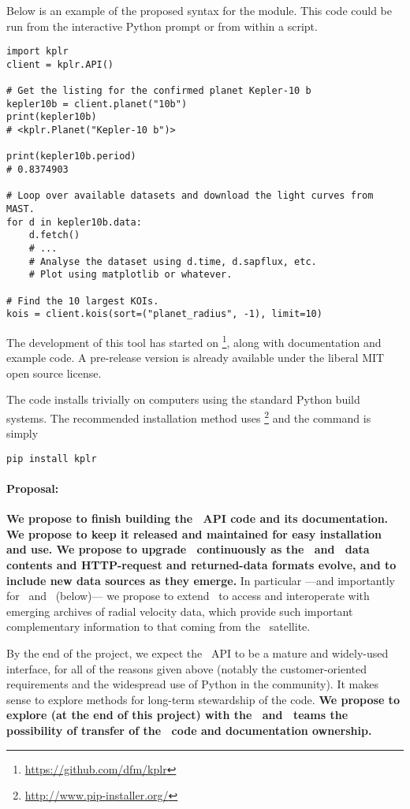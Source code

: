 \documentclass[letterpaper,12pt,preprint]{hack_aastex}
\newcommand{\kplr}{\package{kplr}}
\newcommand{\Bart}{\package{Bart}}
\newcommand{\TheCreator}{\package{TheCreator}}
\begin{document}
Below is an example of the proposed syntax for the module.
This code could be run from the interactive Python prompt or from within a
script.
\begin{lstlisting}
import kplr
client = kplr.API()

# Get the listing for the confirmed planet Kepler-10 b
kepler10b = client.planet("10b")
print(kepler10b)
# <kplr.Planet("Kepler-10 b")>

print(kepler10b.period)
# 0.8374903

# Loop over available datasets and download the light curves from MAST.
for d in kepler10b.data:
    d.fetch()
    # ...
    # Analyse the dataset using d.time, d.sapflux, etc.
    # Plot using matplotlib or whatever.

# Find the 10 largest KOIs.
kois = client.kois(sort=("planet_radius", -1), limit=10)
\end{lstlisting}

The development of this tool has started on %
\footnote{\url{https://github.com/dfm/kplr}},
along with documentation and example code.
A pre-release version is already available under the liberal MIT open source
license.

The code installs trivially on computers using the standard Python build
systems. The recommended installation method uses \footnote{%
\url{http://www.pip-installer.org/}} and the command is simply
\begin{lstlisting}
pip install kplr
\end{lstlisting}

\paragraph{Proposal:}
\textbf{We propose to finish building the \kplr\ API code and its documentation.
We propose to keep it released and maintained for easy installation and use.
We propose to upgrade \kplr\ continuously as the \MAST\ and \EA\ data contents and
HTTP-request and returned-data formats evolve,
and to include new data sources as they emerge.}
In particular%
---and importantly for \Bart\ and \TheCreator\ (below)---%
we propose to extend \kplr\ to access and interoperate with
emerging archives of radial velocity data,
which provide such important complementary information to that coming from
the \Kepler\ satellite.

By the end of the project,
we expect the \kplr\ API to be a mature and widely-used interface,
for all of the reasons given above
 (notably the customer-oriented requirements and the widespread use of Python
in the community).
It makes sense to explore methods for long-term stewardship of the code.
\textbf{We propose to explore (at the end of this project) with the \MAST\ and \EA\ teams the possibility of
transfer of the \kplr\ code and documentation ownership.}
\end{document}
